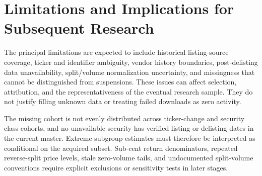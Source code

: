 \section{Limitations and Implications for Subsequent Research}


The principal limitations are expected to include historical listing-source
coverage, ticker and identifier ambiguity, vendor history boundaries,
post-delisting data unavailability, split/volume normalization uncertainty,
and missingness that cannot be distinguished from suspensions. These issues
can affect selection, attribution, and the representativeness of the eventual
research sample. They do not justify filling unknown data or treating failed
downloads as zero activity.

The missing cohort is not evenly distributed across ticker-change and security
class cohorts, and no unavailable security has verified listing or delisting
dates in the current master. Extreme subgroup estimates must therefore be
interpreted as conditional on the acquired subset. Sub-cent return
denominators, repeated reverse-split price levels, stale zero-volume tails, and
undocumented split-volume conventions require explicit exclusions or
sensitivity tests in later stages.
